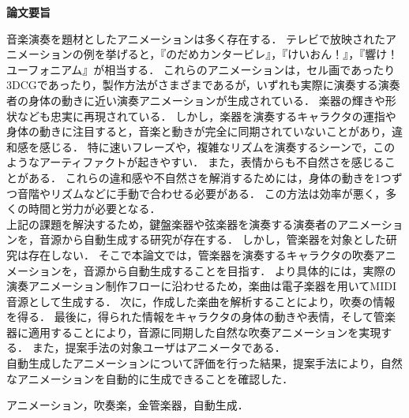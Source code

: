 \begin{center}
{\bf {\large 論文要旨}}
\end{center}

\vspace{3ex}
音楽演奏を題材としたアニメーションは多く存在する．
テレビで放映されたアニメーションの例を挙げると，『のだめカンタービレ』，『けいおん！』，『響け！ユーフォニアム』が相当する．
これらのアニメーションは，セル画であったり3DCGであったり，製作方法がさまざまであるが，いずれも実際に演奏する演奏者の身体の動きに近い演奏アニメーションが生成されている．
楽器の輝きや形状なども忠実に再現されている．
%
しかし，楽器を演奏するキャラクタの運指や身体の動きに注目すると，音楽と動きが完全に同期されていないことがあり，違和感を感じる．
特に速いフレーズや，複雑なリズムを演奏するシーンで，このようなアーティファクトが起きやすい．
また，表情からも不自然さを感じることがある．
これらの違和感や不自然さを解消するためには，身体の動きを1つずつ音階やリズムなどに手動で合わせる必要がある．
この方法は効率が悪く，多くの時間と労力が必要となる．\\
%
\indent
上記の課題を解決するため，鍵盤楽器や弦楽器を演奏する演奏者のアニメーションを，音源から自動生成する研究が存在する．
しかし，管楽器を対象とした研究は存在しない．
そこで本論文では，管楽器を演奏するキャラクタの吹奏アニメーションを，音源から自動生成することを目指す．
より具体的には，実際の演奏アニメーション制作フローに沿わせるため，楽曲は電子楽器を用いてMIDI音源として生成する．
次に，作成した楽曲を解析することにより，吹奏の情報を得る．
最後に，得られた情報をキャラクタの身体の動きや表情，そして管楽器に適用することにより，音源に同期した自然な吹奏アニメーションを実現する．
また，提案手法の対象ユーザはアニメータである．\\
\indent
自動生成したアニメーションについて評価を行った結果，提案手法により，自然なアニメーションを自動的に生成できることを確認した．

\vspace{4ex}

\noindent
{}

\noindent
アニメーション，吹奏楽，金管楽器，自動生成．
